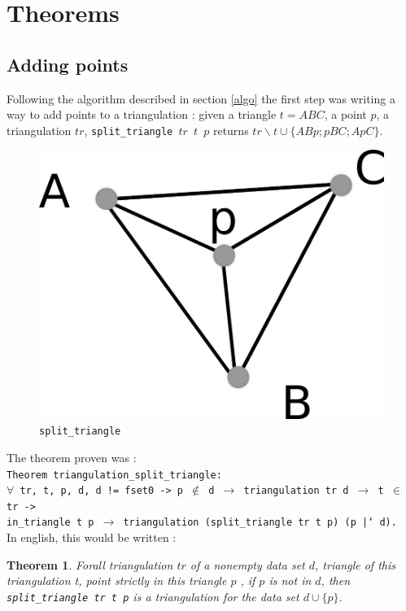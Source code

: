 \documentclass[a4paper,10pt]{article}
\newtheorem{theorem}{Theorem}
\begin{document}
\section{Theorems}
\subsection{Adding points}
\label{theorem1}
Following the algorithm described in section \ref{algo} the first step was writing a way to add points to a triangulation : given a triangle $t = ABC$, a point $p$, a triangulation $tr$, {\tt split\_triangle $tr$ $t$ $p$} returns $tr \smallsetminus t \cup \{ABp;pBC;ApC\}$.
\begin{figure}[h]
  \centering
  \caption{\label{split_triangle} {\tt split\_triangle}}
  \includegraphics[scale=2]{split_triangle}
\end{figure}

 The theorem proven was :\\
{\tt Theorem triangulation\_split\_triangle:\\
  $\forall$ tr, t, p, d, d != fset0 -> p $\notin$ d $\rightarrow$
                        triangulation tr d $\rightarrow$ t $\in$ tr ->\\
                        in\_triangle t p $\rightarrow$
                        triangulation (split\_triangle tr t p) (p |` d).\\
                       }
In english, this would be written :
\begin{theorem}
  Forall triangulation $tr$ of a nonempty data set $d$,
  triangle of this triangulation t, point strictly in this triangle $p$ ,
  if $p$ is not in $d$, then
  {\tt split\_triangle tr t p} is a triangulation for the data set $d \cup \{p\}$.
\end{theorem}
\end{document}
